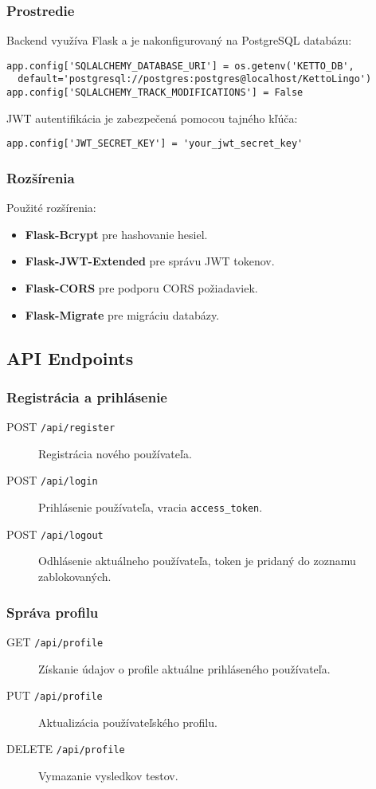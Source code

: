 \documentclass{article}
\begin{document}
\subsubsection{Prostredie}
Backend využíva Flask a je nakonfigurovaný na PostgreSQL databázu:
\begin{lstlisting}
app.config['SQLALCHEMY_DATABASE_URI'] = os.getenv('KETTO_DB', 
  default='postgresql://postgres:postgres@localhost/KettoLingo')
app.config['SQLALCHEMY_TRACK_MODIFICATIONS'] = False
\end{lstlisting}

JWT autentifikácia je zabezpečená pomocou tajného kľúča:
\begin{lstlisting}
app.config['JWT_SECRET_KEY'] = 'your_jwt_secret_key'
\end{lstlisting}

\subsubsection{Rozšírenia}
Použité rozšírenia:
\begin{itemize}
    \item \textbf{Flask-Bcrypt} pre hashovanie hesiel.
    \item \textbf{Flask-JWT-Extended} pre správu JWT tokenov.
    \item \textbf{Flask-CORS} pre podporu CORS požiadaviek.
    \item \textbf{Flask-Migrate} pre migráciu databázy.
\end{itemize}

\subsection{API Endpoints}
\subsubsection{Registrácia a prihlásenie}
\begin{description}
    \item[POST \texttt{/api/register}] Registrácia nového používateľa.
    \item[POST \texttt{/api/login}] Prihlásenie používateľa, vracia \texttt{access\_token}.
    \item[POST \texttt{/api/logout}] Odhlásenie aktuálneho používateľa, token je pridaný do zoznamu zablokovaných.
\end{description}

\subsubsection{Správa profilu}
\begin{description}
    \item[GET \texttt{/api/profile}] Získanie údajov o profile aktuálne prihláseného používateľa.
    \item[PUT \texttt{/api/profile}] Aktualizácia používateľského profilu.
    \item[DELETE \texttt{/api/profile}] Vymazanie vysledkov testov.
\end{description}
\end{document}
